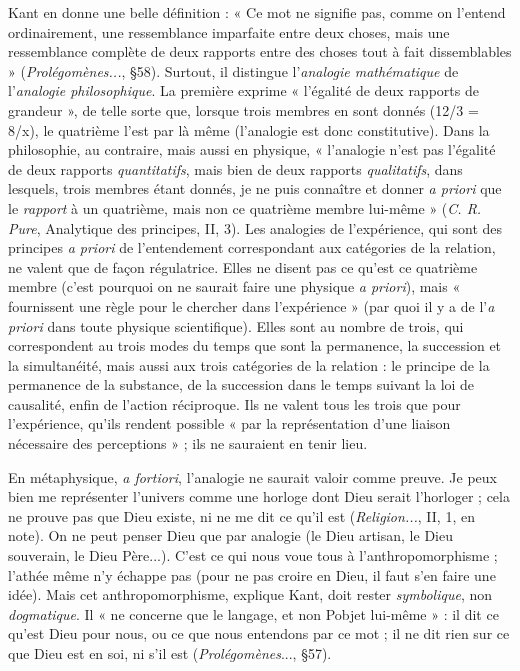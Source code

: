 Kant en donne une belle définition : « Ce mot ne signifie pas, comme on
l'entend ordinairement, une ressemblance imparfaite entre deux choses, mais
une ressemblance complète de deux rapports entre des choses tout à fait
dissemblables » ({\it Prolégomènes...}, \S 58). Surtout, il distingue l’{\it analogie mathématique}
de l’{\it analogie philosophique}. La première exprime « l'égalité de deux rapports
de grandeur », de telle sorte que, lorsque trois membres en sont donnés
(12/3 = 8/x), le quatrième l’est par là même (l’analogie est donc constitutive).
Dans la philosophie, au contraire, mais aussi en physique, « l’analogie n’est pas
l'égalité de deux rapports {\it quantitatifs}, mais bien de deux rapports {\it qualitatifs},
dans lesquels, trois membres étant donnés, je ne puis connaître et donner {\it a
priori} que le {\it rapport} à un quatrième, mais non ce quatrième membre lui-même »
({\it C. R. Pure}, Analytique des principes, II, 3). Les analogies de l’expérience,
qui sont des principes {\it a priori} de l’entendement correspondant aux catégories
de la relation, ne valent que de façon régulatrice. Elles ne disent pas ce
qu’est ce quatrième membre (c’est pourquoi on ne saurait faire une physique {\it a
priori}), mais « fournissent une règle pour le chercher dans l'expérience » (par
quoi il y a de l’{\it a priori} dans toute physique scientifique). Elles sont au nombre
de trois, qui correspondent au trois modes du temps que sont la permanence,
la succession et la simultanéité, mais aussi aux trois catégories de la relation : le
principe de la permanence de la substance, de la succession dans le temps suivant
la loi de causalité, enfin de l’action réciproque. Ils ne valent tous les trois
que pour l'expérience, qu’ils rendent possible « par la représentation d’une
liaison nécessaire des perceptions » ; ils ne sauraient en tenir lieu.

En métaphysique, {\it a fortiori}, l'analogie ne saurait valoir comme preuve. Je
peux bien me représenter l’univers comme une horloge dont Dieu serait
l’horloger ; cela ne prouve pas que Dieu existe, ni ne me dit ce qu’il est ({\it Religion...},
II, 1, en note). On ne peut penser Dieu que par analogie (le Dieu
artisan, le Dieu souverain, le Dieu Père...). C’est ce qui nous voue tous à
l’anthropomorphisme ; l’athée même n’y échappe pas (pour ne pas croire en
Dieu, il faut s’en faire une idée). Mais cet anthropomorphisme, explique Kant,
doit rester {\it symbolique}, non {\it dogmatique}. Il « ne concerne que le langage, et non
Pobjet lui-même » : il dit ce qu’est Dieu pour nous, ou ce que nous entendons
par ce mot ; il ne dit rien sur ce que Dieu est en soi, ni s’il est ({\it Prolégomènes}...,
\S 57).

